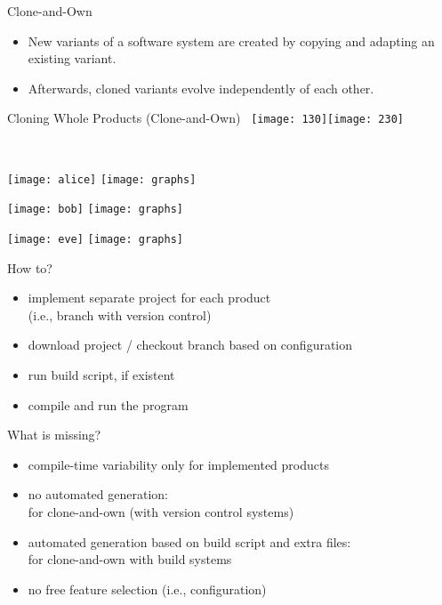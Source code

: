 \begin{frame}{\myframetitle}
	\begin{mycolumns}[columns=2,widths={50,50},animation=none]
		\begin{definition}{Clone-and-Own}
			\begin{itemize}
				\item New variants of a software system are created by copying and adapting an existing variant.
				\item Afterwards, cloned variants evolve independently of each other.
			\end{itemize}	
		\end{definition}	
		\vspace{3mm}		
		\begin{example}{Cloning Whole Products (Clone-and-Own)}
			~\hfill\texttt{[image: 130]}\hfill\texttt{[image: 230]}\hfill~
		\end{example}
	\mynextcolumn
	\end{mycolumns}
\end{frame}

\begin{frame}{\myframetitle}
	\begin{mycolumns}[widths={30}]
		\centering~

		\texttt{[image: alice]}
		\texttt{[image: graphs]}

		\texttt{[image: bob]}
		\texttt{[image: graphs]}

		\texttt{[image: eve]}
		\texttt{[image: graphs]}
	\mynextcolumn
		\begin{definition}{How to?}
			\begin{itemize}
				\item implement separate project for each product\\(i.e., branch with version control)
				\item download project / checkout branch based on configuration
				\item run build script, if existent
				\item compile and run the program
			\end{itemize}
		\end{definition}
		\begin{note}{What is missing?}
			\begin{itemize}
				\item compile-time variability only for implemented products
				\item no automated generation:\\\hfill for clone-and-own (with version control systems)
				\item automated generation based on build script and extra files:\\\hfill for clone-and-own with build systems
				\item no free feature selection (i.e., configuration)
			\end{itemize}
		\end{note}
	\end{mycolumns}
\end{frame}

